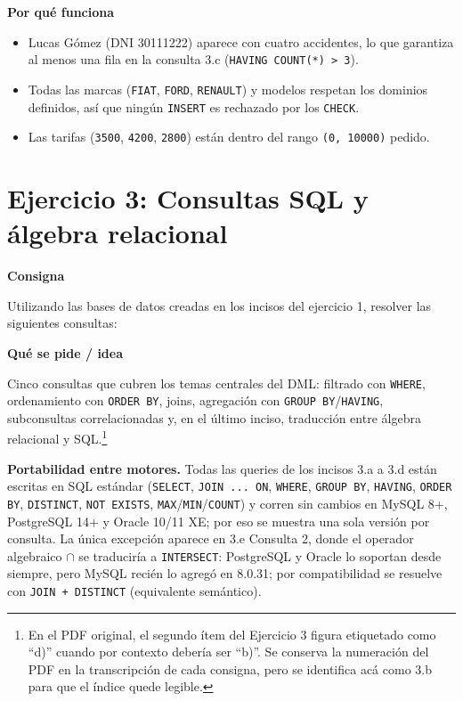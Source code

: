 \documentclass[11pt,a4paper]{article}
\newcommand{\itemcabecera}[1]{\noindent\textbf{#1}\par\medskip}
\newcommand{\bloqueConsigna}{\itemcabecera{Consigna}}
\newcommand{\bloqueIdea}{\itemcabecera{Qu\'e se pide / idea}}
\newcommand{\bloquePorque}{\itemcabecera{Por qu\'e funciona}}
\begin{document}
\bloquePorque

\begin{itemize}
    \item Lucas Gómez (DNI 30111222) aparece con cuatro accidentes, lo que garantiza al menos una fila en la consulta 3.c (\texttt{HAVING COUNT(*) > 3}).
    \item Todas las marcas (\texttt{FIAT}, \texttt{FORD}, \texttt{RENAULT}) y modelos respetan los dominios definidos, así que ningún \texttt{INSERT} es rechazado por los \texttt{CHECK}.
    \item Las tarifas (\texttt{3500}, \texttt{4200}, \texttt{2800}) están dentro del rango \texttt{(0, 10000)} pedido.
\end{itemize}

\section{Ejercicio 3: Consultas SQL y álgebra relacional}

\bloqueConsigna

Utilizando las bases de datos creadas en los incisos del ejercicio 1, resolver las siguientes consultas:

\bloqueIdea

Cinco consultas que cubren los temas centrales del DML: filtrado con \texttt{WHERE}, ordenamiento con \texttt{ORDER BY}, joins, agregación con \texttt{GROUP BY}/\texttt{HAVING}, subconsultas correlacionadas y, en el último inciso, traducción entre álgebra relacional y SQL.\footnote{En el PDF original, el segundo ítem del Ejercicio 3 figura etiquetado como ``d)'' cuando por contexto debería ser ``b)''. Se conserva la numeración del PDF en la transcripción de cada consigna, pero se identifica acá como 3.b para que el índice quede legible.}

\textbf{Portabilidad entre motores.} Todas las queries de los incisos 3.a a 3.d están escritas en SQL estándar (\texttt{SELECT}, \texttt{JOIN ... ON}, \texttt{WHERE}, \texttt{GROUP BY}, \texttt{HAVING}, \texttt{ORDER BY}, \texttt{DISTINCT}, \texttt{NOT EXISTS}, \texttt{MAX}/\texttt{MIN}/\texttt{COUNT}) y corren sin cambios en MySQL 8+, PostgreSQL 14+ y Oracle 10/11 XE; por eso se muestra una sola versión por consulta. La única excepción aparece en 3.e Consulta 2, donde el operador algebraico $\cap$ se traduciría a \texttt{INTERSECT}: PostgreSQL y Oracle lo soportan desde siempre, pero MySQL recién lo agregó en 8.0.31; por compatibilidad se resuelve con \texttt{JOIN + DISTINCT} (equivalente semántico).
\end{document}
